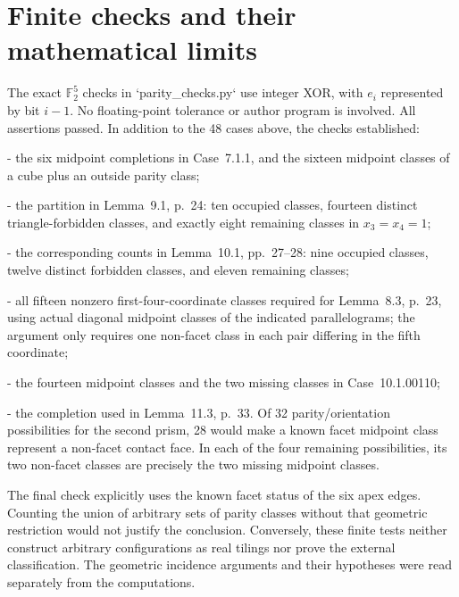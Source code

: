 \documentclass[10pt]{article}
\begin{document}
\section*{Finite checks and their mathematical limits}
The exact \(\mathbb F_2^5\) checks in `parity\_checks.py` use integer XOR, with \(e_i\) represented by bit \(i-1\). No floating-point tolerance or author program is involved. All assertions passed. In addition to the 48 cases above, the checks established:\par
- the six midpoint completions in Case 7.1.1, and the sixteen midpoint classes of a cube plus an outside parity class;\par
- the partition in Lemma 9.1, p. 24: ten occupied classes, fourteen distinct triangle-forbidden classes, and exactly eight remaining classes in \(x_3=x_4=1\);\par
- the corresponding counts in Lemma 10.1, pp. 27–28: nine occupied classes, twelve distinct forbidden classes, and eleven remaining classes;\par
- all fifteen nonzero first-four-coordinate classes required for Lemma 8.3, p. 23, using actual diagonal midpoint classes of the indicated parallelograms; the argument only requires one non-facet class in each pair differing in the fifth coordinate;\par
- the fourteen midpoint classes and the two missing classes in Case 10.1.00110;\par
- the completion used in Lemma 11.3, p. 33. Of 32 parity/orientation possibilities for the second prism, 28 would make a known facet midpoint class represent a non-facet contact face. In each of the four remaining possibilities, its two non-facet classes are precisely the two missing midpoint classes.\par
The final check explicitly uses the known facet status of the six apex edges. Counting the union of arbitrary sets of parity classes without that geometric restriction would not justify the conclusion. Conversely, these finite tests neither construct arbitrary configurations as real tilings nor prove the external classification. The geometric incidence arguments and their hypotheses were read separately from the computations.\par
\end{document}
